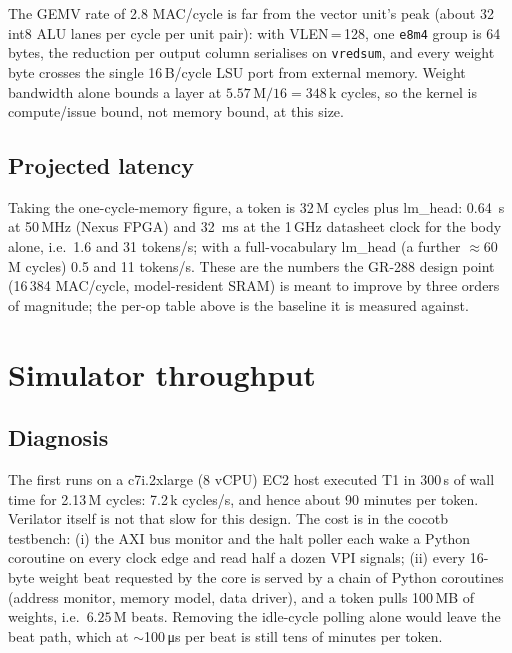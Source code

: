\documentclass[10pt,twocolumn]{article}
\begin{document}
The GEMV rate of 2.8 MAC/cycle is far from the vector unit's peak (about 32
int8 ALU lanes per cycle per unit pair): with VLEN\,=\,128, one \texttt{e8m4}
group is 64 bytes, the reduction per output column serialises on
\texttt{vredsum}, and every weight byte crosses the single 16\,B/cycle LSU port
from external memory. Weight bandwidth alone bounds a layer at
$5.57\,\text{M}/16 = 348$\,k cycles, so the kernel is compute/issue bound, not
memory bound, at this size.

\subsection{Projected latency}
Taking the one-cycle-memory figure, a token is 32\,M cycles plus lm\_head:
\SI{0.64}{s} at 50\,MHz (Nexus FPGA) and \SI{32}{ms} at the 1\,GHz datasheet
clock for the body alone, i.e.\ 1.6 and 31 tokens/s; with a full-vocabulary
lm\_head (a further $\approx$60\,M cycles) 0.5 and 11 tokens/s. These are the numbers the GR-288 design point
(16\,384 MAC/cycle, model-resident SRAM) is meant to improve by three orders of
magnitude; the per-op table above is the baseline it is measured against.

\section{Simulator throughput}
\subsection{Diagnosis}
The first runs on a c7i.2xlarge (8 vCPU) EC2 host executed T1 in 300\,s of
wall time for 2.13\,M cycles: 7.2\,k cycles/s, and hence about 90 minutes per
token. Verilator itself is not that slow for this design. The cost is in the
cocotb testbench: (i) the AXI bus monitor and the halt poller each wake a
Python coroutine on every clock edge and read half a dozen VPI signals;
(ii) every 16-byte weight beat requested by the core is served by a chain of
Python coroutines (address monitor, memory model, data driver), and a token
pulls 100\,MB of weights, i.e.\ $6.25$\,M beats. Removing the idle-cycle
polling alone would leave the beat path, which at $\sim$100\,\si{\micro\second}
per beat is still tens of minutes per token.
\end{document}
